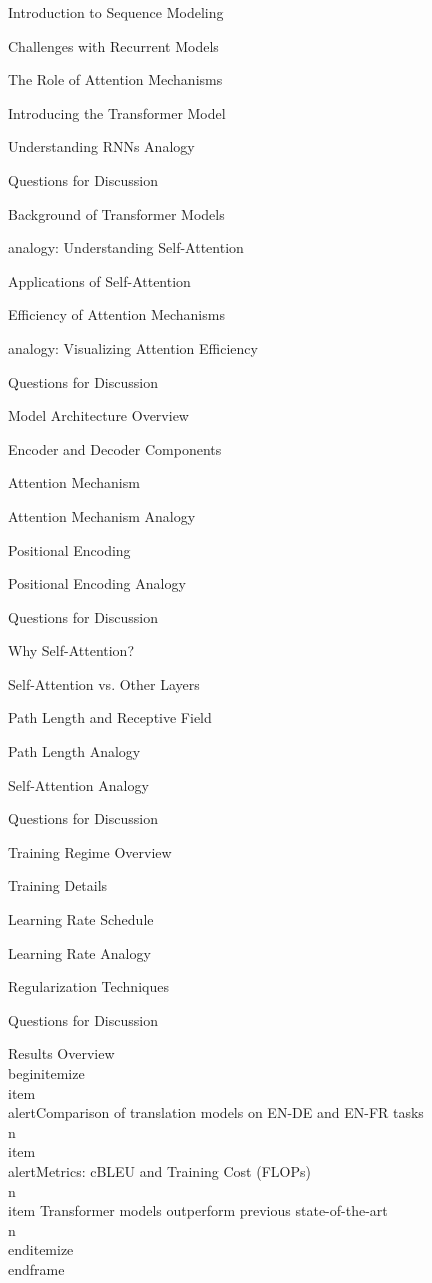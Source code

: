 \documentclass{beamer}
\begin{document}
\begin{frame}[]{Introduction to Sequence Modeling}
\begin{frame}[]{Challenges with Recurrent Models}
\begin{frame}[]{The Role of Attention Mechanisms}
\begin{frame}[]{Introducing the Transformer Model}
\begin{frame}[plain]{Understanding RNNs Analogy}
\begin{frame}[]{Questions for Discussion}
\begin{frame}[]{Background of Transformer Models}
\begin{frame}[plain]{analogy: Understanding Self-Attention}
\begin{frame}[]{Applications of Self-Attention}
\begin{frame}[]{Efficiency of Attention Mechanisms}
\begin{frame}[plain]{analogy: Visualizing Attention Efficiency}
\begin{frame}[]{Questions for Discussion}
\begin{frame}[]{Model Architecture Overview}
\begin{frame}[]{Encoder and Decoder Components}
\begin{frame}[]{Attention Mechanism}
\begin{frame}[plain]{Attention Mechanism Analogy}
\begin{frame}[]{Positional Encoding}
\begin{frame}[plain]{Positional Encoding Analogy}
\begin{frame}[]{Questions for Discussion}
\begin{frame}[]{Why Self-Attention?}
\begin{frame}[]{Self-Attention vs. Other Layers}
\begin{frame}[]{Path Length and Receptive Field}
\begin{frame}[plain]{Path Length Analogy}
\begin{frame}[plain]{Self-Attention Analogy}
\begin{frame}[]{Questions for Discussion}
\begin{frame}[]{Training Regime Overview}
\begin{frame}[]{Training Details}
\begin{frame}[]{Learning Rate Schedule}
\begin{frame}[plain]{Learning Rate Analogy}
\begin{frame}[]{Regularization Techniques}
\begin{frame}[]{Questions for Discussion}
\begingroup
{}\n{}\n\begin{frame}[]{Results Overview}\n\\begin{itemize}
\\item \\alert{Comparison of translation models on EN-DE and EN-FR tasks}\\n\\item \\alert{Metrics: cBLEU and Training Cost (FLOPs)}\\n\\item Transformer models outperform previous state-of-the-art\\n\\end{itemize}
\\end{frame}

\endgroup


\end{frame}
\end{frame}
\end{frame}
\end{frame}
\end{frame}
\end{frame}
\end{frame}
\end{frame}
\end{frame}
\end{frame}
\end{frame}
\end{frame}
\end{frame}
\end{frame}
\end{frame}
\end{frame}
\end{frame}
\end{frame}
\end{frame}
\end{frame}
\end{frame}
\end{frame}
\end{frame}
\end{frame}
\end{frame}
\end{frame}
\end{frame}
\end{frame}
\end{frame}
\end{frame}
\end{frame}
\end{frame}
\end{document}
